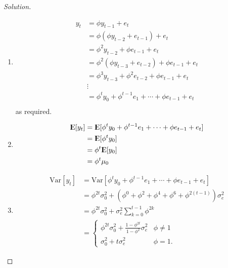 \documentclass[UTF8,a4paper,14pt]{ctexart}
\newcommand{\E}{{\rm I\kern-.3em E}}
\newcommand{\Var}{\mathrm{Var}}
\newenvironment{solution}
  {\renewcommand\qedsymbol{$\blacksquare$}\begin{proof}[Solution]}
  {\end{proof}}
\theoremstyle{definition}
\theoremstyle{remark}
\begin{document}
\begin{solution}\,
  \begin{enumerate}[label=(\alph*)]
    \item \begin{equation}
      \begin{aligned}
        y_t &= \phi y_{t-1}+e_t\\
        &= \phi (\phi y_{t-2}+e_{t-1})+e_t\\
        &= \phi^2 y_{t-2} + \phi e_{t-1} + e_t\\
        &= \phi^2 (\phi y_{t-3}+e_{t-2}) + \phi e_{t-1}+e_t\\
        &= \phi^3  y_{t-3} + \phi ^2 e_{t-2} + \phi e_{t-1}+e_t\\     
        &\vdots\\
        &=\phi^t  y_{0} + \phi ^{t-1} e_{1}+\cdots + \phi e_{t-1}+e_t\\ 
      \end{aligned}
    \end{equation}
    as required.
    \item \begin{equation}
      \begin{aligned}
        \E[y_t] &=\E[\phi^t  y_{0} + \phi ^{t-1} e_{1}+\cdots + \phi e_{t-1}+e_t]\\ 
        &=\E[\phi^t  y_{0}]\\
        &=\phi^t \E[y_{0}]\\
        &=\phi^t \mu_0\\
      \end{aligned}
    \end{equation}
    \item \begin{equation}
      \begin{aligned}
        \Var[y_t] &=\Var[\phi^t  y_{0} + \phi ^{t-1} e_{1}+\cdots + \phi e_{t-1}+e_t]\\ 
        &=\phi^{2t}\sigma_0^2 + (\phi^{0}+\phi^{2}+\phi^{4} +\phi^{6} +\phi^{2(t-1)})\sigma_{e}^2 \\
        &=\phi^{2t}\sigma_0^2 +\sigma_{e}^2\sum_{k = 0}^{t-1} \phi^{2k} \\  
        &= \begin{cases}
          \phi^{2t}\sigma_0^2+\frac{1-\phi^{2t}}{1-\phi^{2}}\sigma_e^2 & \phi\neq 1\\
          \sigma_0^2+t\sigma_e^2  & \phi= 1.
        \end{cases}      
      \end{aligned}

\end{equation}
\end{enumerate}
\end{solution}
\end{document}
